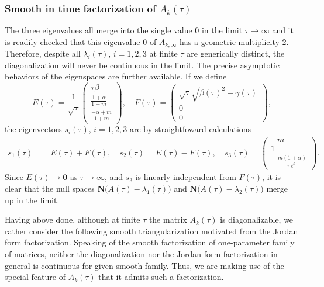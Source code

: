 \documentclass[a4paper,11pt]{article}
\def\l{{\ell}}
\theoremstyle{remark}
\begin{document}
\subsubsection{Smooth in time factorization of $A_k(\tau)$}
The three eigenvalues all merge into the single value $0$ in the limit $\tau \rightarrow \infty$ and it is readily checked that this eigenvalue $0$ of $A_{k,\infty}$ has a geometric multiplicity $2$. Therefore, despite all $\lambda_i(\tau)$, $i=1,2,3$ at finite $\tau$ are generically distinct, the diagonalization will never be continuous in the limit.
The precise asymptotic behaviors of the eigenspaces are further available. %
If we define
$$ E(\tau) = \frac{1}{\sqrt{\tau}} \begin{pmatrix} \tau\beta \\ \frac{1+\alpha}{1+m} \\ \frac{-\alpha+m}{1+m} \end{pmatrix}, \quad  F(\tau)= \begin{pmatrix}  \sqrt{\tau}\sqrt{\beta(\tau)^2-\gamma(\tau)}\\0\\0 \end{pmatrix},$$
the eigenvectors $s_i(\tau)$, $i=1,2,3$ are by straightfoward calculations
\begin{align*}
 s_1(\tau)&=E(\tau) + F(\tau), \quad s_2(\tau)=E(\tau)-F(\tau), \quad s_3(\tau) = \begin{pmatrix} -m\\1\\ -\frac{m(1+\alpha)}{\tau\l^2} \end{pmatrix}.
\end{align*}
Since $E(\tau) \rightarrow \mathbf{0}$ as $\tau \rightarrow \infty$, and $s_3$ is linearly independent from $F(\tau)$, it is clear that the null spaces $\mathbf{N}\Big(A(\tau) - \lambda_1(\tau)\Big)$ and $\mathbf{N}\Big(A(\tau) - \lambda_2(\tau)\Big)$ merge up in the limit.


Having above done, although at finite $\tau$ the matrix $A_k(\tau)$ is diagonalizable, we rather consider the following smooth triangularization motivated from the Jordan form factorization. Speaking of the smooth factorization of one-parameter family of matrices, neither the diagonalization nor the Jordan form factorization in general is continuous for given smooth family. Thus, we are making use of the special feature of $A_k(\tau)$ that it admits such a factorization.
\end{document}
